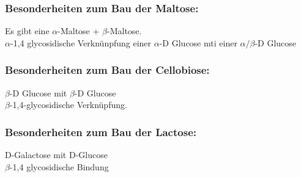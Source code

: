 \subsubsection{Besonderheiten zum Bau der Maltose:}
Es gibt eine $\alpha$-Maltose + $\beta$-Maltose. \\
$\alpha$-1,4 glycosidische Verknünpfung einer $\alpha$-D Glucose mti einer $\alpha/\beta$-D Glucose

\subsubsection{Besonderheiten zum Bau der Cellobiose:}
$\beta$-D Glucose mit $\beta$-D Glucose \\
$\beta$-1,4-glycosidische Verknüpfung.

\subsubsection{Besonderheiten zum Bau der Lactose:}
D-Galactose mit D-Glucose \\
$\beta$-1,4 glycosidische Bindung

